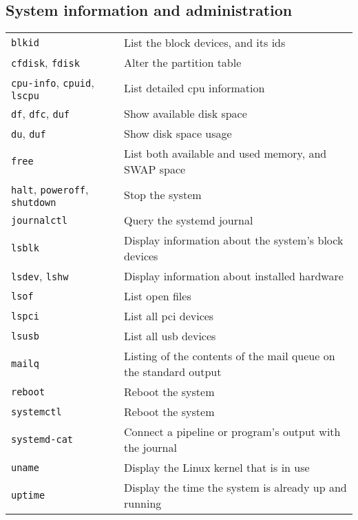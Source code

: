 \documentclass[10pt]{article}
\begin{document}
\cheatsheet

\begin{multicols}{2}

\section{System information and administration}
\begin{tabular}{ p{2.5cm} p{8.5cm} }
  \hline
  \texttt{blkid} & List the block devices, and its ids \\
  \rowcolor{Gray}
  \texttt{cfdisk}, \texttt{fdisk} & Alter the partition table \\
  \texttt{cpu-info}, \texttt{cpuid}, \texttt{lscpu} & List detailed cpu information \\
  \rowcolor{Gray}
  \texttt{df}, \texttt{dfc}, \texttt{duf} & Show available disk space \\
  \texttt{du}, \texttt{duf} & Show disk space usage \\
  \rowcolor{Gray}
  \texttt{free} & List both available and used memory, and SWAP space  \\
  \texttt{halt}, \texttt{poweroff}, \texttt{shutdown} & Stop the system \\
  \rowcolor{Gray}
  \texttt{journalctl} & Query the systemd journal \\
  \texttt{lsblk} & Display information about the system's block devices\\
  \rowcolor{Gray}
  \texttt{lsdev}, \texttt{lshw} & Display information about installed hardware\\
  \texttt{lsof} & List open files \\
  \rowcolor{Gray}
  \texttt{lspci} & List all pci devices\\
  \texttt{lsusb} & List all usb devices\\
  \rowcolor{Gray}
  \texttt{mailq} & Listing of the contents of the mail queue on the standard output\\
  \texttt{reboot} & Reboot the system\\
  \rowcolor{Gray}
  \texttt{systemctl} & Reboot the system\\
  \texttt{systemd-cat} & Connect a pipeline or program's output with the journal\\
  \rowcolor{Gray}
  \texttt{uname} & Display the Linux kernel that is in use\\
  \texttt{uptime} & Display the time the system is already up and running\\
  \hline
\end{tabular}


\end{multicols}
\end{document}

